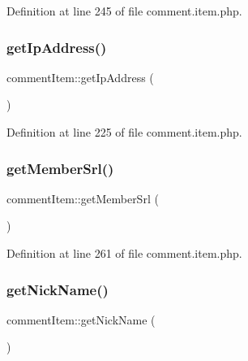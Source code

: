 Definition at line 245 of file comment.\+item.\+php.

\mbox{\label{classcommentItem_a487957e1ef240fd2ff03f122f7827347}} 
\subsubsection{\texorpdfstring{get\+Ip\+Address()}{getIpAddress()}}
{\footnotesize\ttfamily comment\+Item\+::get\+Ip\+Address (\begin{DoxyParamCaption}{ }\end{DoxyParamCaption})}



Definition at line 225 of file comment.\+item.\+php.

\mbox{\label{classcommentItem_a6cf2c8baefdc9183f0194805bc197231}} 
\subsubsection{\texorpdfstring{get\+Member\+Srl()}{getMemberSrl()}}
{\footnotesize\ttfamily comment\+Item\+::get\+Member\+Srl (\begin{DoxyParamCaption}{ }\end{DoxyParamCaption})}



Definition at line 261 of file comment.\+item.\+php.

\mbox{\label{classcommentItem_a097673677cd1c461040cbc9275b7fca9}} 
\subsubsection{\texorpdfstring{get\+Nick\+Name()}{getNickName()}}
{\footnotesize\ttfamily comment\+Item\+::get\+Nick\+Name (\begin{DoxyParamCaption}{ }\end{DoxyParamCaption})}



